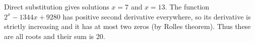 Direct substitution gives solutions $x=7$ and $x=13$. The function $2^x-1344x+9280$ has positive second derivative everywhere, so its derivative is strictly increasing and it has at most two zeros (by Rolle\textquotesingle s theorem). Thus these are all roots and their sum is $\boxed{20}$.
